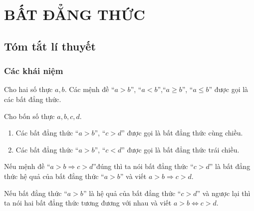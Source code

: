 \section{BẤT ĐẲNG THỨC}
\subsection{Tóm tắt lí thuyết}
\subsubsection{Các khái niệm}
\begin{kn}
Cho hai số thực $a,b$. Các mệnh đề ``$a>b$'', ``$a<b$'',``$a\ge b$'', ``$a\le b$'' được gọi là các bất đẳng thức.
\end{kn}
\begin{kn}
Cho bốn số thực $a,b,c,d$.
\begin{enumerate}[]
	\item Các bất đẳng thức ``$a>b$'', ``$c>d$'' được gọi là bất đẳng thức cùng chiều.
	\item Các bất đẳng thức ``$a>b$'', ``$c<d$'' được gọi là bất đẳng thức trái chiều.
\end{enumerate}
\end{kn}
\begin{kn}
Nếu mệnh đề ``$a>b\Rightarrow c>d$''đúng thì ta nói bất đẳng thức ``$c>d$'' là bất đẳng thức hệ quả của bất đẳng thức ``$a>b$'' và viết $a>b\Rightarrow c>d$.
\end{kn}
\begin{kn}
Nếu bất đẳng thức ``$a>b$'' là hệ quả của bất đẳng thức ``$c>d$'' và ngược lại thì ta nói hai bất đẳng thức tương đương với nhau và viết $a>b\Leftrightarrow c>d$.
\end{kn}
